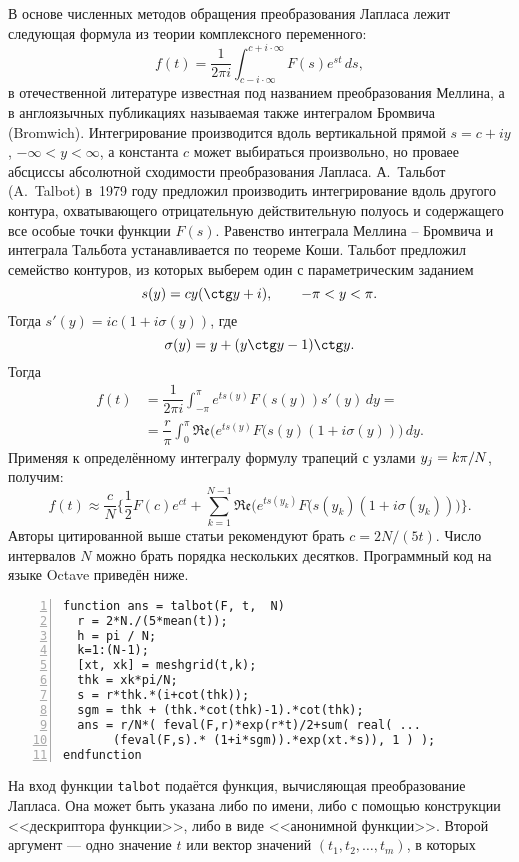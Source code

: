 \documentclass[10pt,oneside,final]{book}
\newcommand*{\hm}[1]{#1\nobreak\discretionary{}%
  {\hbox{$\mathsurround=0pt #1$}}{}}
\begin{document}
В основе численных методов обращения преобразования Лапласа лежит следующая
формула из теории комплексного переменного:
\[
f(t) = \dfrac{1}{2\pi i} \int_{c-i\cdot\infty}^{c+i\cdot\infty} F(s) e^{st}\,ds,
\]
в отечественной литературе известная под названием преобразования Меллина, а в
англоязычных публикациях называемая также интегралом Бромвича
(\foreignlanguage{english}{Bromwich}). Интегрирование производится вдоль
вертикальной прямой $s=c+i y$, $-\infty<y<\infty$, а константа $c$ может
выбираться произвольно, но проваее абсциссы абсолютной сходимости преобразования
Лапласа. А.~Тальбот (A.~Talbot) в~1979 году предложил производить интегрирование
вдоль другого контура, охватывающего отрицательную действительную полуось и
содержащего все особые точки функции $F(s)$. Равенство интеграла Меллина --
Бромвича и интеграла Тальбота устанавливается по теореме Коши. Тальбот предложил
семейство контуров, из которых выберем один с параметрическим заданием 
\[
s(y)=cy(\ctg y+i),\qquad -\pi<y<\pi.
\]
Тогда 
\(s'(y)=i c (1+i \sigma(y))\), где 
$$
\sigma(y)=y+(y\ctg y-1)\ctg y.
$$
Тогда
\begin{align*}
  f(t)&=\dfrac{1}{2\pi i} \int_{-\pi}^\pi e^{ts(y)} F(s(y)) s'(y)\, dy=
  \\ &=
  \dfrac{r}{\pi} \int_0^\pi \mathfrak{Re}\bigl(
  e^{ts(y)} F(s(y)(1+i \sigma(y)) \bigr)\,dy.
\end{align*}
Применяя к определённому интегралу формулу трапеций с узлами $y_j\hm=k\pi/N$, получим:
\[
f(t)\approx\dfrac{c}{N}
\biggl\{
\dfrac12 F(c) e^{ct}+
\sum_{k=1}^{N-1} \mathfrak{Re}\bigl(
  e^{ts(y_k)} F(s(y_k)(1+i \sigma(y_k)) \bigr)
\biggr\}.
\]
Авторы цитированной выше статьи рекомендуют брать $c=2N/(5t)$. Число интервалов
$N$ можно брать порядка нескольких десятков. Программный код на языке
\foreignlanguage{english}{Octave} 
приведён ниже.
\begin{Verbatim}[frame=single,xleftmargin=2em,numbers=left]
function ans = talbot(F, t,  N)
  r = 2*N./(5*mean(t));
  h = pi / N;
  k=1:(N-1);
  [xt, xk] = meshgrid(t,k);
  thk = xk*pi/N;
  s = r*thk.*(i+cot(thk));
  sgm = thk + (thk.*cot(thk)-1).*cot(thk);
  ans = r/N*( feval(F,r)*exp(r*t)/2+sum( real( ...
       (feval(F,s).* (1+i*sgm)).*exp(xt.*s)), 1 ) );
endfunction
\end{Verbatim}
На вход функции \texttt{talbot} подаётся функция, вычисляющая преобразование
Лапласа. Она может быть указана либо по имени, либо с помощью конструкции
<<дескриптора функции>>, либо в виде <<анонимной функции>>. Второй аргумент ---
одно значение $t$ или вектор значений $(t_1, t_2, \ldots, t_m)$, в которых
\end{document}
